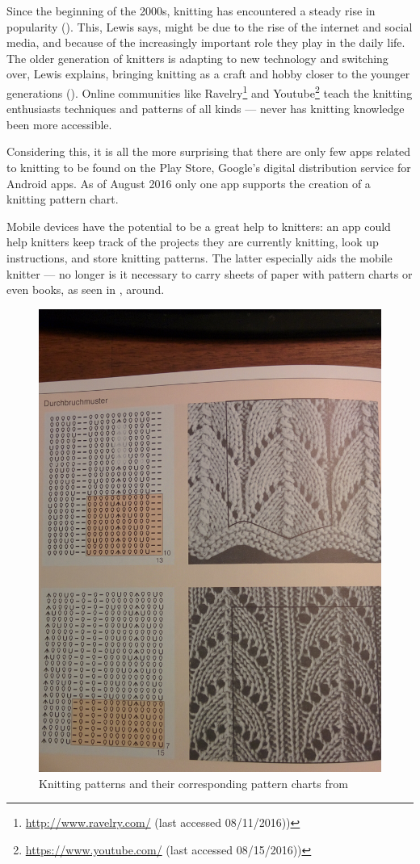 Since the beginning of the 2000s, knitting has encountered a steady rise in popularity (\cite{lewis_rise_of_knitting}). This, Lewis says, might be due to the rise of the internet and social media, and because of the increasingly important role they play in the daily life. The older generation of knitters is adapting to new technology and switching over, Lewis explains, bringing knitting as a craft and hobby closer to the younger generations (\cite{lewis_rise_of_knitting}). Online communities like Ravelry\footnote{\url{http://www.ravelry.com/} (last accessed 08/11/2016))} and Youtube\footnote{\url{https://www.youtube.com/} (last accessed 08/15/2016))} teach the knitting enthusiasts techniques and patterns of all kinds --- never has knitting knowledge been more accessible.

Considering this, it is all the more surprising that there are only few apps related to knitting to be found on the Play Store, Google's digital distribution service for Android apps. As of August 2016 only one app supports the creation of a knitting pattern chart. 

Mobile devices have the potential to be a great help to knitters: an app could help knitters keep track of the projects they are currently knitting, look up instructions, and store knitting patterns. The latter especially aids the mobile knitter --- no longer is it necessary to carry sheets of paper with pattern charts or even books, as seen in , around.

\begin{figure}[H]
	\centering
    \includegraphics[width=.45\textwidth]{images/knitting_pattern_chart_book.jpg}
   \caption[{Knitting patterns and their corresponding pattern charts \protect{}}]{Knitting patterns and their corresponding pattern charts from \protect\cite[p142]{Natter1983}}
   \label{fig:knitting_book}
\end{figure}

